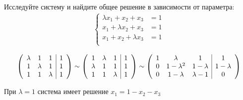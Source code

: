 \begin{prb}[Кострикин 8.2 е]
Исследуйте систему и найдите общее решение в зависимости от параметра:\\

\begin{gather*}
\begin{cases}
\lambda x_1 +  x_2 + x_3 &= 1 \\
 x_1 +  \lambda x_2 + x_3 &= 1 \\
 x_1 +  x_2 + \lambda x_3 &= 1 \\
\end{cases}
\end{gather*}

\end{prb}

\begin{sol}
\begin{gather*}
    \left(\begin{array}{c c c|c}
        \lambda & 1 & 1 & 1\\
        1 & \lambda & 1 & 1\\
        1 & 1 & \lambda & 1\\
    \end{array}\right)
    \sim
    \left(\begin{array}{c c c|c}
    1 & \lambda & 1 & 1 \\
    \lambda & 1 & 1 & 1 \\
    1 & 1 & \lambda & 1 \\
    \end{array}\right)
    \sim
    \left(
    \begin{array}{ccc|c}
     1 & \lambda & 1 & 1 \\
     0 & 1  - \lambda^2 & 1 - \lambda & 1 - \lambda \\
     0 & 1 - \lambda & \lambda - 1 & 0 \\
    \end{array}
    \right)
\end{gather*}

При $\lambda = 1$ система имеет решение $x_1 = 1 - x_2 -x_3$


\end{sol}

